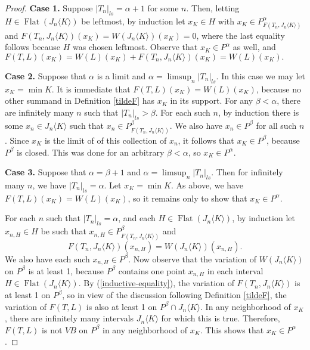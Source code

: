 \documentclass[12pt]{amsart}
\renewcommand{\flat}{\operatorname{Flat}}
\begin{document}
\begin{proof}
{\bf Case 1.} Suppose $|T_n|_{ls} = \alpha+ 1$ 
for some $n$.  Then, letting $H\in \flat(J_n\langle K \rangle)$
be leftmost, by induction
let $x_K \in H$ with $x_K \in P^\alpha_{F(T_n,J_n\langle K\rangle)}$
and $F(T_n,J_n\langle K\rangle)(x_K) = W(J_n\langle K \rangle)(x_K)=0$, 
where the last equality follows because $H$ was chosen leftmost. 
Observe that 
$x_K \in P^\alpha$ as well, and $F(T,L)(x_K) = W(L)(x_K) + F(T_n,J_n\langle K\rangle)(x_K) = W(L)(x_K).$

{\bf Case 2.} Suppose that $\alpha$ is a limit and $\alpha = \limsup_n |T_n|_{ls}$.  In this case we may let $x_K = \min K$. 
It is immediate that $F(T,L)(x_K) = W(L)(x_K)$, because no other summand 
in Definition \ref{tildeF} has $x_K$ in its support.  For any $\beta < \alpha$,
there are infinitely many $n$ such that $|T_n|_{ls} > \beta$.  
For each such $n$, by induction there is some $x_n \in J_n\langle K \rangle$ 
such that $x_n \in P^\beta_{F(T_n,J_n\langle K \rangle)}$.  We also 
have $x_n \in P^\beta$ for all such $n$.  Since $x_K$ is the limit of 
of this collection of $x_n$, it follows that $x_K \in P^\beta$, 
because $P^\beta$ is closed.  This was done for an arbitrary $\beta< \alpha$, 
so $x_K \in P^\alpha$.

{\bf Case 3.}
Suppose that $\alpha = \beta+1$ and $\alpha = \limsup_n |T_n|_{ls}$. 
Then for infinitely many $n$, we have 
$|T_n|_{ls} = \alpha$.  Let $x_K = \min K$.  As above, we have 
$F(T,L)(x_K) = W(L)(x_K)$, so it remains only to show that $x_K \in P^\alpha$.

For each $n$ such that $|T_n|_{ls} = \alpha$, and each 
$H \in \flat(J_n\langle K\rangle)$, by induction let $x_{n,H} \in H$ 
be such that $x_{n,H} \in P^\beta_{F(T_n, J_n\langle K \rangle)}$ and
\begin{equation}\label{inductive-equality}F(T_n, J_n\langle K \rangle)(x_{n,H}) = W(J_n\langle K\rangle)(x_{n,H}).\end{equation}
We also have each such $x_{n,H} \in P^\beta$.  Now observe that 
the variation of $W(J_n\langle K \rangle)$ on 
$P^\beta$ is at least 1, because $P^\beta$ 
contains one point $x_{n,H}$ in each interval 
$H \in \flat(J_n\langle K\rangle)$. By (\ref{inductive-equality}), 
the variation of $F(T_n, J_n\langle K \rangle)$ is at least 1 on $P^\beta$, 
so in view of the discussion following 
Definition \ref{tildeF}, the variation of $F(T,L)$ 
is also at least 1 on $P^\beta \cap J_n\langle K \rangle$.  
In any neighborhood of $x_K$, there are infinitely many intervals 
$J_n \langle K \rangle$ for which this is true.  Therefore,
 $F(T,L)$ is not $VB$ on 
$P^\beta$ in any neighborhood of $x_K$.  
This shows that $x_K \in P^\alpha$.\end{proof}
\end{document}
